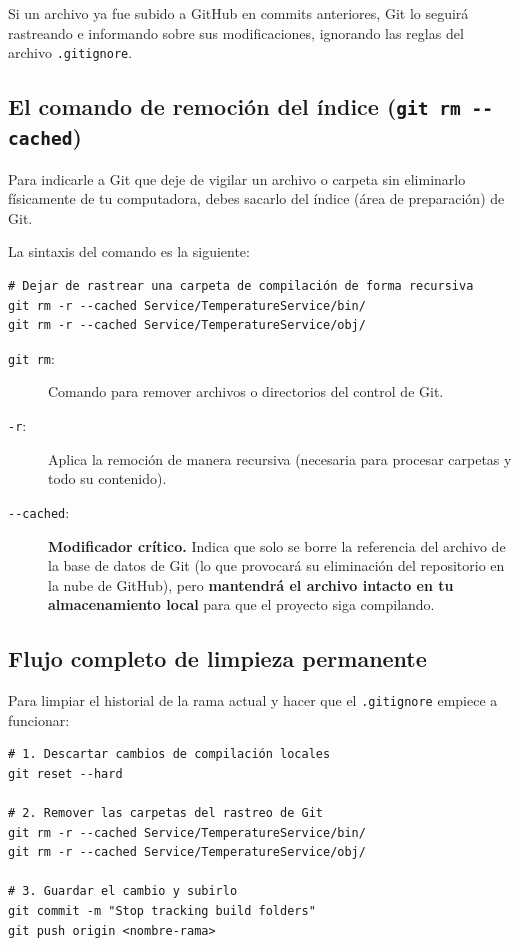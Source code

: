 \documentclass[
10pt, %
a4paper, %
oneside, %
headinclude,footinclude, %
BCOR5mm, %
]{scrartcl}
\begin{document}
Si un archivo ya fue subido a GitHub en commits anteriores, Git lo seguirá rastreando e informando sobre sus modificaciones, ignorando las reglas del archivo \texttt{.gitignore}.

\subsection{El comando de remoción del índice (\texttt{git rm -{}-cached})}
Para indicarle a Git que deje de vigilar un archivo o carpeta sin eliminarlo físicamente de tu computadora, debes sacarlo del índice (área de preparación) de Git.

La sintaxis del comando es la siguiente:
\begin{lstlisting}[language=DOS]
# Dejar de rastrear una carpeta de compilación de forma recursiva
git rm -r --cached Service/TemperatureService/bin/
git rm -r --cached Service/TemperatureService/obj/
\end{lstlisting}

\begin{description}
	\item[\texttt{git rm}:] Comando para remover archivos o directorios del control de Git.
	\item[\texttt{-r}:] Aplica la remoción de manera recursiva (necesaria para procesar carpetas y todo su contenido).
	\item[\texttt{-{}-cached}:] \textbf{Modificador crítico.} Indica que solo se borre la referencia del archivo de la base de datos de Git (lo que provocará su eliminación del repositorio en la nube de GitHub), pero \textbf{mantendrá el archivo intacto en tu almacenamiento local} para que el proyecto siga compilando.
\end{description}

\subsection{Flujo completo de limpieza permanente}
Para limpiar el historial de la rama actual y hacer que el \texttt{.gitignore} empiece a funcionar:
\begin{lstlisting}[language=DOS]
# 1. Descartar cambios de compilación locales
git reset --hard

# 2. Remover las carpetas del rastreo de Git
git rm -r --cached Service/TemperatureService/bin/
git rm -r --cached Service/TemperatureService/obj/

# 3. Guardar el cambio y subirlo
git commit -m "Stop tracking build folders"
git push origin <nombre-rama>
\end{lstlisting}
\end{document}

